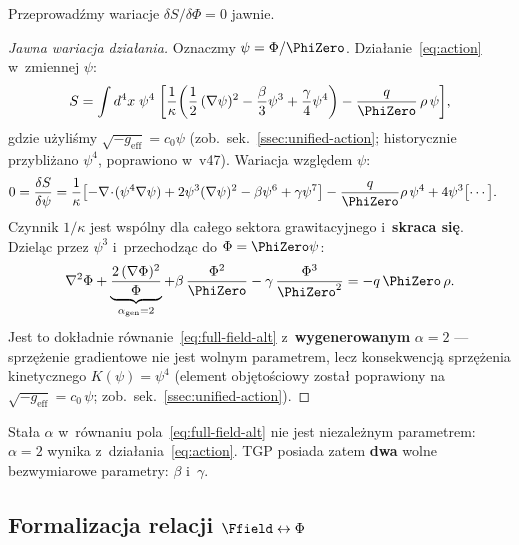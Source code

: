 Przeprowad\'zmy wariacje $\delta S/\delta\Phi = 0$ jawnie.

\begin{proof}[Jawna wariacja dzia\l{}ania]
Oznaczmy $\psi = \Phi/\PhiZero$. Dzia\l{}anie~\eqref{eq:action}
w~zmiennej $\psi$:
\[
  S = \int d^4x\;\psi^4\;\biggl[
    \frac{1}{\kappa}\biggl(
      \frac{1}{2}\,(\nabla\psi)^2
      - \frac{\beta}{3}\psi^3 + \frac{\gamma}{4}\psi^4
    \biggr)
    - \frac{q}{\PhiZero}\,\rho\,\psi
  \biggr],
\]
gdzie u\.zyli\'smy $\sqrt{-g_{\mathrm{eff}}} = c_0\psi$
(zob.\ sek.~\ref{ssec:unified-action}; historycznie
przybli\.zano $\psi^4$, poprawiono w~v47).
Wariacja wzgl\k{e}dem $\psi$:
\begin{align}
  0 &= \frac{\delta S}{\delta\psi}
  = \frac{1}{\kappa}\bigl[
    -\nabla\!\cdot\!(\psi^4\nabla\psi)
    + 2\psi^3(\nabla\psi)^2
    - \beta\psi^6 + \gamma\psi^7
  \bigr]
  - \frac{q}{\PhiZero}\rho\,\psi^4
  + 4\psi^3\bigl[\cdots\bigr]. \nonumber
\end{align}
Czynnik $1/\kappa$ jest wsp\'olny dla ca\l{}ego sektora
grawitacyjnego i~\textbf{skraca si\k{e}}.
Dziel\k{a}c przez $\psi^3$ i~przechodz\k{a}c do $\Phi = \PhiZero\psi$:
\begin{equation}\label{eq:variation-explicit}
  \nabla^2\Phi
  + \underbrace{\frac{2\,(\nabla\Phi)^2}{\Phi}}_{\alpha_{\mathrm{gen}}=2}
  + \beta\,\frac{\Phi^2}{\PhiZero}
  - \gamma\,\frac{\Phi^3}{\PhiZero^2}
  = -q\,\PhiZero\,\rho.
\end{equation}
Jest to dok\l{}adnie r\'ownanie~\eqref{eq:full-field-alt}
z~\textbf{wygenerowanym} $\alpha = 2$ --- sprz\k{e}\.zenie
gradientowe nie jest wolnym parametrem, lecz konsekwencj\k{a}
sprz\k{e}\.zenia kinetycznego $K(\psi)=\psi^4$
(element obj\k{e}to\'sciowy zosta\l{} poprawiony na
$\sqrt{-g_{\mathrm{eff}}} = c_0\,\psi$;
zob.\ sek.~\ref{ssec:unified-action}).
\end{proof}

\begin{corollary}\label{cor:alpha-fixed}
Sta\l{}a $\alpha$ w~r\'ownaniu pola~\eqref{eq:full-field-alt}
nie jest niezale\.znym parametrem: $\alpha = 2$ wynika
z~dzia\l{}ania~\eqref{eq:action}. TGP posiada zatem
\textbf{dwa} wolne bezwymiarowe parametry: $\beta$ i~$\gamma$.
\end{corollary}

\subsection{Formalizacja relacji $\Ffield \leftrightarrow \Phi$}\label{ssec:F-Phi}

